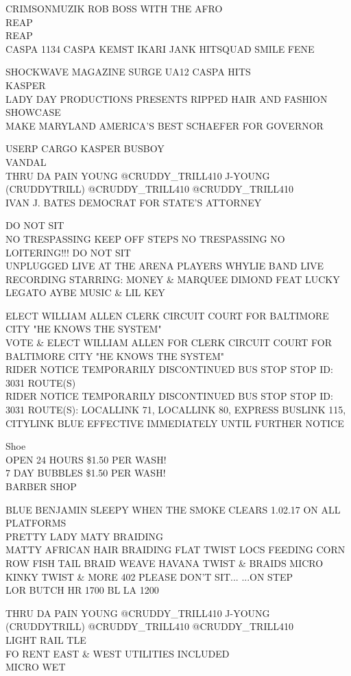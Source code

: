 \documentclass[10pt,letterpaper]{article}
\begin{document}
CRIMSONMUZIK ROB BOSS WITH THE AFRO\\
REAP\\
REAP\\
CASPA 1134 CASPA KEMST IKARI JANK HITSQUAD SMILE FENE

SHOCKWAVE MAGAZINE SURGE UA12 CASPA HITS\\
KASPER\\
LADY DAY PRODUCTIONS PRESENTS RIPPED HAIR AND FASHION SHOWCASE\\
MAKE MARYLAND AMERICA'S BEST SCHAEFER FOR GOVERNOR

USERP CARGO KASPER BUSBOY\\
VANDAL\\
THRU DA PAIN YOUNG @CRUDDY\_TRILL410 J{-}YOUNG (CRUDDYTRILL) @CRUDDY\_TRILL410 @CRUDDY\_TRILL410\\
IVAN J. BATES DEMOCRAT FOR STATE'S ATTORNEY

DO NOT SIT\\
NO TRESPASSING KEEP OFF STEPS NO TRESPASSING NO LOITERING!!! DO NOT SIT\\
UNPLUGGED LIVE AT THE ARENA PLAYERS WHYLIE BAND LIVE RECORDING STARRING: MONEY \& MARQUEE DIMOND FEAT LUCKY LEGATO AYBE MUSIC \& LIL KEY

ELECT WILLIAM ALLEN CLERK CIRCUIT COURT FOR BALTIMORE CITY "HE KNOWS THE SYSTEM"\\
VOTE \& ELECT WILLIAM ALLEN FOR CLERK CIRCUIT COURT FOR BALTIMORE CITY "HE KNOWS THE SYSTEM"\\
RIDER NOTICE TEMPORARILY DISCONTINUED BUS STOP STOP ID: 3031 ROUTE(S)\\
RIDER NOTICE TEMPORARILY DISCONTINUED BUS STOP STOP ID: 3031 ROUTE(S): LOCALLINK 71, LOCALLINK 80, EXPRESS BUSLINK 115, CITYLINK BLUE EFFECTIVE IMMEDIATELY UNTIL FURTHER NOTICE

Shoe\\
OPEN 24 HOURS \$1.50 PER WASH!\\
7 DAY BUBBLES \$1.50 PER WASH!\\
BARBER SHOP

BLUE BENJAMIN SLEEPY WHEN THE SMOKE CLEARS 1.02.17 ON ALL PLATFORMS\\
PRETTY LADY MATY BRAIDING\\
MATTY AFRICAN HAIR BRAIDING FLAT TWIST LOCS FEEDING CORN ROW FISH TAIL BRAID WEAVE HAVANA TWIST \& BRAIDS MICRO KINKY TWIST \& MORE 402 PLEASE DON'T SIT... ...ON STEP\\
LOR BUTCH HR 1700 BL LA 1200

THRU DA PAIN YOUNG @CRUDDY\_TRILL410 J{-}YOUNG (CRUDDYTRILL) @CRUDDY\_TRILL410 @CRUDDY\_TRILL410\\
LIGHT RAIL TLE\\
FO RENT EAST \& WEST UTILITIES INCLUDED\\
MICRO WET
\end{document}
